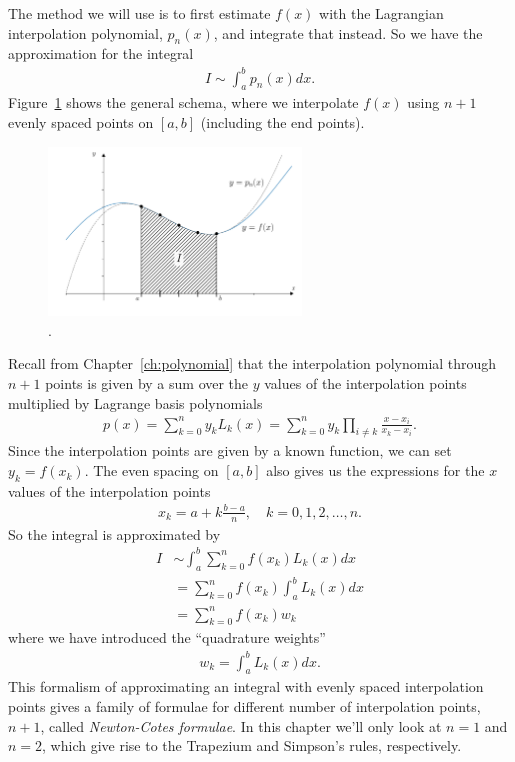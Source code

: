 The method we will use is to first estimate $f(x)$ with the Lagrangian interpolation polynomial, $p_n(x)$, and integrate that instead. So we have the approximation for the integral
\begin{align*}
I \sim \int_a^b p_n(x) dx.
\end{align*}
Figure~\ref{fig:ch5_lagrangian} shows the general schema, where we interpolate $f(x)$ using $n+1$ evenly spaced points on $[a,b]$ (including the end points).
\begin{figure}[H]
	\begin{center}
	\includegraphics[width=0.6\textwidth]{figures/ch5_lagrangian.pdf} 
	  \caption{.} \label{fig:ch5_lagrangian}
	\end{center}
\end{figure}

Recall from Chapter~\ref{ch:polynomial} that the interpolation polynomial through $n+1$ points is given by a sum over the $y$ values of the interpolation points multiplied by Lagrange basis polynomials
\begin{align*}
p(x)  = \sum_{k=0}^n y_k L_k(x) = \sum_{k=0}^n y_k \prod_{i\neq k} \frac{x-x_i}{x_k-x_i}.
\end{align*}
Since the interpolation points are given by a known function, we can set $y_k=f(x_k)$. The even spacing on $[a,b]$ also gives us the expressions for the $x$ values of the interpolation points
\begin{align*}
x_k = a + k\frac{b-a}{n}, \quad k=0,1,2,\dots,n.
\end{align*}
So the integral is approximated by
\begin{align*}
I &\sim \int_a^b \sum_{k=0}^n f(x_k) L_k(x) dx \\
&=  \sum_{k=0}^n f(x_k) \int_a^b L_k(x) dx \\
&=  \sum_{k=0}^n f(x_k) w_k
\end{align*}
where we have introduced the ``quadrature weights''
\begin{align*}
w_k = \int_a^b L_k(x) dx.
\end{align*}
This formalism of approximating an integral with evenly spaced interpolation points gives a family of formulae for different number of interpolation points, $n+1$, called \textit{Newton-Cotes formulae}. In this chapter we'll only look at $n=1$ and $n=2$, which give rise to the Trapezium and Simpson's rules, respectively.

